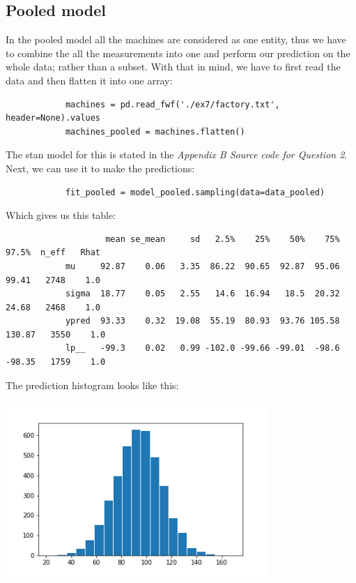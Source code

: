 \documentclass[11pt,a4paper,english]{article}
\begin{document}
        \subsection{Pooled model}
          In the pooled model all the machines are considered as one entity, thus we have to combine the all the measurements into one and perform our prediction on the whole data; rather than a subset. With that in mind, we have to first read the data and then flatten it into one array:
          \begin{verbatim}
            machines = pd.read_fwf('./ex7/factory.txt', header=None).values
            machines_pooled = machines.flatten()
          \end{verbatim}
          The stan model for this is stated in the \textit{Appendix B  Source code for Question 2}.
          Next, we can use it to make the predictions:
          \begin{verbatim}
            fit_pooled = model_pooled.sampling(data=data_pooled)
          \end{verbatim}
          Which gives us this table:
          \begin{verbatim}
                    mean se_mean     sd   2.5%    25%    50%    75%  97.5%  n_eff   Rhat
            mu     92.87    0.06   3.35  86.22  90.65  92.87  95.06  99.41   2748    1.0
            sigma  18.77    0.05   2.55   14.6  16.94   18.5  20.32  24.68   2468    1.0
            ypred  93.33    0.32  19.08  55.19  80.93  93.76 105.58 130.87   3550    1.0
            lp__   -99.3    0.02   0.99 -102.0 -99.66 -99.01  -98.6 -98.35   1759    1.0
          \end{verbatim}
          The prediction histogram looks like this:
          \begin{center}
            \includegraphics[width=10cm]{pooled_hist.png}
          \end{center}
\end{document}
